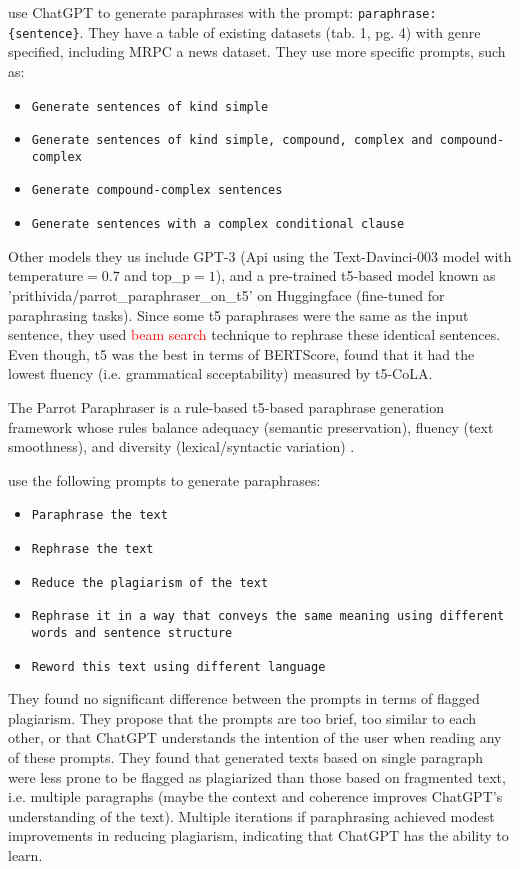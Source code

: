 \citet{kurt_pehlivanoglu_comparative_2024} use ChatGPT to generate paraphrases with the prompt:
\texttt{paraphrase:\{sentence\}}.
They have a table of existing datasets (tab. 1, pg. 4) with genre specified, including MRPC a news dataset.
They use more specific prompts, such as:
\begin{itemize}
    \item \texttt{Generate sentences of kind simple}
    \item \texttt{Generate sentences of kind simple, compound, complex and compound-complex}
    \item \texttt{Generate compound-complex sentences}
    \item \texttt{Generate sentences with a complex conditional clause}
\end{itemize}
Other models they us include GPT-3 (Api using the Text-Davinci-003 model with temperature$=0.7$ and top\_p$=1$), 
and a pre-trained \ac{t5}-based model known as 'prithivida/parrot\_paraphraser\_on\_\ac{t5}' on Huggingface (fine-tuned for paraphrasing tasks).
Since some \ac{t5} paraphrases were the same as the input sentence, they used \textcolor{red}{beam search} technique to rephrase these identical sentences.
Even though, \ac{t5} was the best in terms of BERTScore, 
\citet{kurt_pehlivanoglu_comparative_2024} found that it had the lowest fluency (i.e. grammatical scceptability) measured by \ac{t5}-CoLA.

The Parrot Paraphraser is a rule-based \ac{t5}-based paraphrase generation framework whose 
rules balance adequacy (semantic preservation), fluency (text smoothness), and diversity (lexical/syntactic variation) \cite{zhou_paraphrase_2025}.

\citet{hassanipour_ability_2024} use the following prompts to generate paraphrases:
\begin{itemize}
    \item \texttt{Paraphrase the text}
    \item \texttt{Rephrase the text}
    \item \texttt{Reduce the plagiarism of the text}
    \item \texttt{Rephrase it in a way that conveys the same meaning using different words and sentence structure}
    \item \texttt{Reword this text using different language}
\end{itemize}
They found no significant difference between the prompts in terms of flagged plagiarism.
They propose that the prompts are too brief, too similar to each other, or that ChatGPT understands the intention of the user when reading any of these prompts.
They found that generated texts based on single paragraph were less prone to be flagged as plagiarized than those based on fragmented text, i.e. multiple paragraphs
(maybe the context and coherence improves ChatGPT's understanding of the text).
Multiple iterations if paraphrasing achieved modest improvements in reducing plagiarism, indicating that ChatGPT has the ability to learn.

